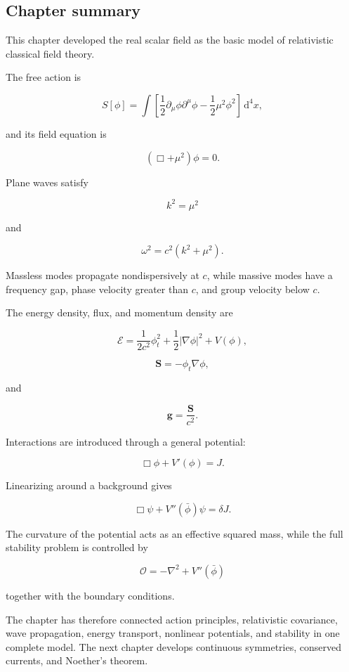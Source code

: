 \subsection{Chapter summary}

This chapter developed the real scalar field as the basic model of relativistic classical field theory.

The free action is

\[
S[\phi]
=
\int
\left[
\frac{1}{2}
\partial_{\mu}\phi\partial^{\mu}\phi
-
\frac{1}{2}\mu^{2}\phi^{2}
\right]
\,\mathrm{d}^{4}x,
\]

and its field equation is

\[
\boxed{
(\Box+\mu^{2})\phi=0
}.
\]

Plane waves satisfy

\[
k^{2}=\mu^{2}
\]

and

\[
\omega^{2}
=
c^{2}(k^{2}+\mu^{2}).
\]

Massless modes propagate nondispersively at \(c\), while massive modes have a frequency gap, phase velocity greater than \(c\), and group velocity below \(c\).

The energy density, flux, and momentum density are

\[
\mathcal{E}
=
\frac{1}{2c^{2}}\phi_{t}^{2}
+
\frac{1}{2}|\nabla\phi|^{2}
+
V(\phi),
\]

\[
\mathbf{S}
=
-\phi_{t}\nabla\phi,
\]

and

\[
\mathbf{g}
=
\frac{\mathbf{S}}{c^{2}}.
\]

Interactions are introduced through a general potential:

\[
\Box\phi+V'(\phi)=J.
\]

Linearizing around a background gives

\[
\Box\psi+V''(\bar\phi)\psi=\delta J.
\]

The curvature of the potential acts as an effective squared mass, while the full stability problem is controlled by

\[
\mathcal{O}
=
-\nabla^{2}+V''(\bar\phi)
\]

together with the boundary conditions.

The chapter has therefore connected action principles, relativistic covariance, wave propagation, energy transport, nonlinear potentials, and stability in one complete model. The next chapter develops continuous symmetries, conserved currents, and Noether's theorem.